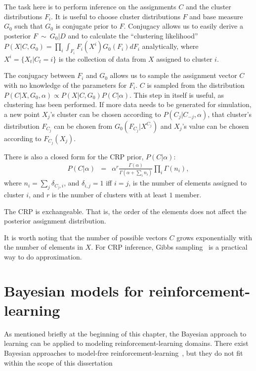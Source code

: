The task here is to perform inference on the assignments $C$ and the cluster distributions $F_i$. It is useful to choose cluster distributions $F$ and base measure $G_0$ such that $G_0$ is conjugate prior to $F$. Conjugacy allows us to easily derive a posterior $F~\sim~G_0|D$ and to calculate the ``clustering likelihood'' $P(X|C,G_0)=\prod_i\int_{F_i} F_i(X^i)G_0(F_i)dF_i$ analytically, where $X^i=\{X_t|C_t=i\}$ is the collection of data from $X$ assigned to cluster $i$. 

The conjugacy between $F_i$ and $G_0$ allows us to sample the assignment vector $C$ with no knowledge of the parameters for $F_i$. $C$ is sampled from the distribution $P(C|X,G_0,\alpha)\propto P(X|C,G_0)P(C|\alpha)$. This step in itself is useful, as clustering has been performed. If more data needs to be generated for simulation, a new point $X_j$'s cluster can be chosen according to $P(C_j|C_{-j},\alpha)$, that cluster's distribution $F_{C_j}$ can be chosen from $G_0(F_{C_j}|X^{C_j})$ and $X_j$'s value can be chosen according to $F_{C_j}(X_j)$.

There is also a closed form for the CRP prior, $P(C|\alpha)$:
\begin{eqnarray}
P(C|\alpha)&=&\alpha^r \frac {\Gamma(\alpha)}{\Gamma(\alpha+\sum_i n_i)}\prod_i\Gamma(n_i),\label{eq:crp}
\end{eqnarray}
where $n_i = \sum_{j} \delta_{C_j,i}$, and $\delta_{i,j}=1$ iff $i=j$, is the number of elements assigned to cluster $i$, and $r$ is the number of clusters with at least $1$ member.

The CRP is exchangeable. That is, the order of the elements does not affect the posterior assignment distribution.

It is worth noting that the number of possible vectors $C$ grows exponentially with the number of elements in $X$. For CRP inference, Gibbs sampling~\cite{andrieu03,neal00} is a practical way to do approximation.

\section{Bayesian models for reinforcement-learning}

As mentioned briefly at the beginning of this chapter, the Bayesian approach to learning can be applied to modeling reinforcement-learning domains. There exist Bayesian approaches to model-free reinforcement-learning~\cite{dearden98}, but they do not fit within the scope of this dissertation  

